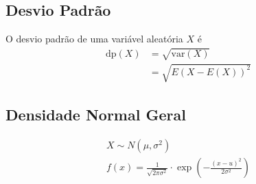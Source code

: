\documentclass{article}
\begin{document}
\subsection{Desvio Padrão}
O desvio padrão de uma variável aleatória $X$ é
\begin{align*}
  \text{dp}(X) & = \sqrt{\text{var}(X)} \\
  & = \sqrt{{E(X - E(X))}^2}
\end{align*}

\pagebreak

\subsection{Densidade Normal Geral}
\begin{gather*}
  X \sim N(\mu, \sigma^2) \\[5pt]
  f(x) = \frac{1}{\sqrt{2 \pi \sigma^2}} \cdot \exp \left(- \frac{{(x - u)}^2}{2\sigma^2} \right)
\end{gather*}
\end{document}

